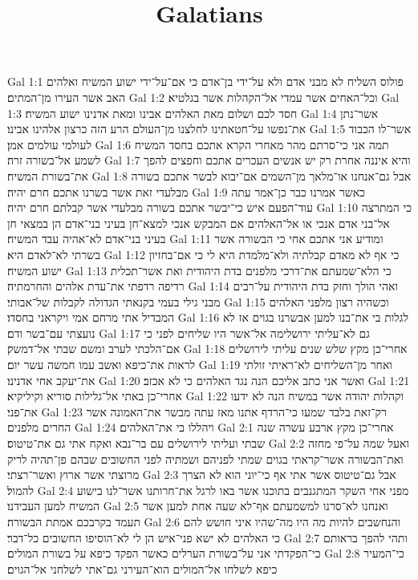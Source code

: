 

\title{Galatians}

Gal 1:1  פולוס השליח לא מבני אדם ולא על־ידי בן־אדם כי אם־על־ידי ישוע המשיח ואלהים האב אשר העירו מן־המתים׃
Gal 1:2  וכל־האחים אשר עמדי אל־הקהלות אשר בגלטיא׃
Gal 1:3  חסד לכם ושלום מאת האלהים אבינו ומאת אדנינו ישוע המשיח׃
Gal 1:4  אשר־נתן את־נפשו על־חטאתינו לחלצנו מן־העולם הרע הזה כרצון אלהינו אבינו׃
Gal 1:5  אשר־לו הכבוד לעולמי עולמים אמן׃
Gal 1:6  תמה אני כי־סרתם מהר מאחרי הקרא אתכם בחסד המשיח לשמע אל־בשורה זרה׃
Gal 1:7  והיא איננה אחרת רק יש אנשים העכרים אתכם וחפצים להפך את־בשורת המשיח׃
Gal 1:8  אבל גם־אנחנו או־מלאך מן־השמים אם־יבוא לבשר אתכם בשורה מבלעדי זאת אשר בשרנו אתכם חרם יהיה׃
Gal 1:9  כאשר אמרנו כבר כן־אמר עתה עוד־הפעם איש כי־יבשר אתכם בשורה מבלעדי אשר קבלתם חרם יהיה׃
Gal 1:10  כי המתרצה אל־בני אדם אנכי או אל־האלהים אם המבקש אנכי למצא־חן בעיני בני־אדם הן במצאי חן בעיני בני־אדם לא־אהיה עבד המשיח׃
Gal 1:11  ומודיע אני אתכם אחי כי הבשורה אשר בשרתי לא־לאדם היא׃
Gal 1:12  כי אף לא מאדם קבלתיה ולא־מלמדת היא לי כי אם־בחזיון ישוע המשיח׃
Gal 1:13  כי הלא־שמעתם את־דרכי מלפנים בדת היהודית ואת אשר־תכלית רדיפה רדפתי את־עדת אלהים והחרמתיה׃
Gal 1:14  ואהי הולך וחזק בדת היהודית על־רבים מבני גילי בעמי בקנאתי הגדולה לקבלות של־אבותי׃
Gal 1:15  וכשהיה רצון מלפני האלהים המבדיל אתי מרחם אמי ויקראני בחסדו׃
Gal 1:16  לגלות בי את־בנו למען אבשרנו בגוים אז לא נועצתי עם־בשר ודם׃
Gal 1:17  גם לא־עליתי ירושלימה אל־אשר היו שליחים לפני כי אם־הלכתי לערב ומשם שבתי אל־דמשק׃
Gal 1:18  אחרי־כן מקץ שלש שנים עליתי לירושלים לראות את־כיפא ואשב עמו חמשה עשר יום׃
Gal 1:19  ואחר מן־השליחים לא־ראיתי זולתי את־יעקב אחי אדנינו׃
Gal 1:20  ואשר אני כתב אליכם הנה נגד האלהים כי לא אכזב׃
Gal 1:21  אחרי־כן באתי אל־גלילות סוריא וקיליקיא׃
Gal 1:22  וקהלות יהודה אשר במשיח הנה לא ידעו את־פני׃
Gal 1:23  רק־זאת בלבד שמעו כי־הרדף אתנו מאז עתה מבשר את־האמונה אשר החרים מלפנים׃
Gal 1:24  ויהללו בי את־האלהים׃
Gal 2:1  אחרי־כן מקץ ארבע עשרה שנה שבתי ועליתי לירושלים עם בר־נבא ואקח אתי גם את־טיטוס׃
Gal 2:2  ואעל שמה על־פי מחזה ואת־הבשורה אשר־קראתי בגוים שמתי לפניהם ושמתיה לפני החשובים שבהם פן־תהיה לריק מרוצתי אשר ארוץ ואשר־רצתי׃
Gal 2:3  אבל גם־טיטוס אשר אתי אף כי־יוני הוא לא הצרך להמול׃
Gal 2:4  מפני אחי השקר המתגנבים בתוכנו אשר באו לרגל את־חרותנו אשר־לנו בישוע המשיח למען העבידנו׃
Gal 2:5  ואנחנו לא־סרנו למשמעתם אף־לא שעה אחת למען אשר תעמד בקרבכם אמתת הבשורה׃
Gal 2:6  והנחשבים להיות מה היו מה־שהיו איני חושש להם כי האלהים לא ישא פני־איש הן לי לא־הוסיפו החשובים כל־דבר׃
Gal 2:7  ותהי להפך בראותם כי־הפקדתי אני על־בשורת הערלים כאשר הפקד כיפא על בשורת המולים׃
Gal 2:8  כי־המעיר כיפא לשלחו אל־המולים הוא־העירני גם־אתי לשלחני אל־הגוים׃
